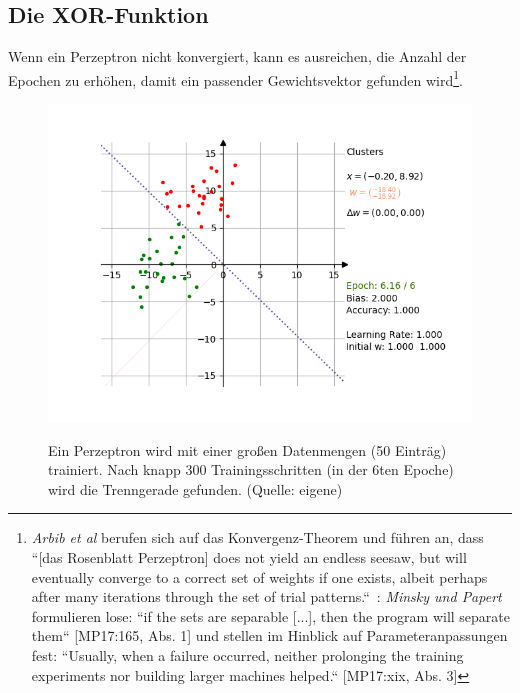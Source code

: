 \noindent{}




\subsection{Die XOR-Funktion}

Wenn ein Perzeptron nicht konvergiert, kann es ausreichen, die Anzahl der Epochen zu erhöhen, damit ein passender Gewichtsvektor gefunden wird\footnote{
    \textit{Arbib et al} berufen sich auf das Konvergenz-Theorem und führen an, dass ``[das Rosenblatt Perzeptron] does not yield an endless seesaw, but will eventually converge to a correct set of weights if one exists, albeit perhaps after many iterations through the set of trial patterns.``~\cite[20]{Arb03}: \textit{Minsky und Papert} formulieren lose: ``if the sets are separable [...], then the program will separate them`` [MP17:165, Abs. 1] und stellen im Hinblick auf Parameteranpassungen fest: ``Usually, when a failure occurred, neither prolonging the training experiments nor building larger machines helped.`` [MP17:xix, Abs. 3]
}.

\begin{figure}[h]
    \centering
    \includegraphics{images/rosenblatt/blob_success.png}
    \caption{}
    \label{fig-rp-blobs}
    \small Ein Perzeptron wird mit einer großen Datenmengen (50 Einträg) trainiert. Nach knapp 300 Trainingsschritten (in der 6ten Epoche) wird die Trenngerade gefunden. (Quelle: eigene)
\end{figure}

